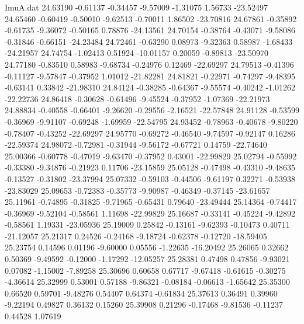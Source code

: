 \begin{filecontents}{ImuA.dat}
  24.63190   -0.61137   -0.34457   -9.57009   -1.31075    1.56733  -23.52497
  24.65460   -0.60419   -0.50010   -9.62513   -0.70011    1.86502  -23.70816
  24.67861   -0.35892   -0.61735   -9.36072   -0.50165    0.78876  -24.13561
  24.70154   -0.38764   -0.43071   -9.58086   -0.31846   -0.66151  -24.23484
  24.72461   -0.63290    0.08973   -9.32363    0.58987   -1.68433  -24.21957
  24.74754   -1.02413    0.51924  -10.01157    0.20059   -0.89813  -23.50970
  24.77180   -0.83510    0.58983   -9.68734   -0.24976    0.12469  -22.69297
  24.79513   -0.41396   -0.11127   -9.57847   -0.37952    1.01012  -21.82281
  24.81821   -0.22971   -0.74297   -9.48395   -0.63141    0.33842  -21.98310
  24.84124   -0.38285   -0.64367   -9.55574   -0.40242   -1.01262  -22.22736
  24.86418   -0.30628   -0.61496   -9.45524   -0.37952   -1.07369  -22.21973
  24.88834   -0.40558   -0.66401   -9.26620   -0.29556   -2.16521  -22.57848
  24.91128   -0.53599   -0.36969   -9.91107   -0.69248   -1.69959  -22.54795
  24.93452   -0.78963   -0.40678   -9.80220   -0.78407   -0.43252  -22.69297
  24.95770   -0.69272   -0.46540   -9.74597   -0.92147    0.16286  -22.59374
  24.98072   -0.72981   -0.31944   -9.56172   -0.67721    0.14759  -22.74640
  25.00366   -0.60778   -0.47019   -9.63470   -0.37952    0.43001  -22.99829
  25.02794   -0.55992   -0.33380   -9.34876   -0.21923    0.11706  -23.15859
  25.05128   -0.47498   -0.43310   -9.48635   -0.13527   -0.31802  -23.37994
  25.07332   -0.59103   -0.44506   -9.61197    0.32271   -0.53938  -23.83029
  25.09653   -0.72383   -0.35773   -9.90987   -0.46349   -0.37145  -23.61657
  25.11961   -0.74895   -0.31825   -9.71965   -0.65431    0.79640  -23.49444
  25.14364   -0.74417   -0.36969   -9.52104   -0.58561    1.11698  -22.99829
  25.16687   -0.33141   -0.45224   -9.42892   -0.58561    1.19331  -23.05936
  25.19009    0.25842   -0.13161   -9.62393   -0.10473    0.40711  -21.12057
  25.21317    0.24526   -0.24168   -9.18724   -0.62378   -0.12720  -18.59405
  25.23754    0.14596    0.01196   -9.60000    0.05556   -1.22635  -16.20492
  25.26065    0.32662    0.50369   -9.49592   -0.12000   -1.17292  -12.05257
  25.28381    0.47498    0.47856   -9.93021    0.07082   -1.15002   -7.89258
  25.30696    0.60658    0.67717   -9.67418   -0.61615   -0.30275   -4.36614
  25.32999    0.53001    0.57188   -9.86321   -0.08184   -0.06613   -1.65642
  25.35300    0.66520    0.59701   -9.48276    0.54407    0.64374   -0.61834
  25.37613    0.36491    0.39960   -9.22194    0.49827    0.36132    0.15260
  25.39908    0.21296   -0.17468   -9.81536   -0.11237    0.44528    1.07619

\end{filecontents}
